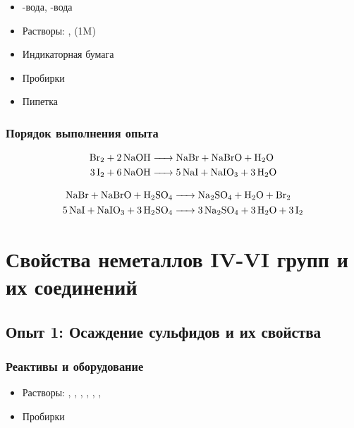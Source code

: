 \documentclass[a4paper, 12pt]{article}
\begin{document}
\begin{itemize}
	\item {}-вода, -вода
	
	\item Растворы: ,  (1M)
	
	\item Индикаторная бумага
	
	\item Пробирки
	
	\item Пипетка
\end{itemize}

\subsubsection{Порядок выполнения опыта}

\begin{align}
	\ce{Br2 + 2NaOH &-> NaBr + NaBrO + H2O}\\
	\ce{3I2 + 6NaOH &-> 5NaI + NaIO3 + 3H2O}
\end{align}

\begin{align}
	\ce{NaBr + NaBrO + H2SO4 &-> Na2SO4 + H2O + Br2}\\
	\ce{5NaI + NaIO3 + 3H2SO4 &-> 3Na2SO4 + 3H2O + 3I2}
\end{align}

\newpage


\section{Свойства неметаллов IV-VI групп и их соединений}

\subsection{Опыт 1: Осаждение сульфидов и их свойства}

\subsubsection{Реактивы и оборудование}

\begin{itemize}
	\item Растворы: , , , , , , 
	
	\item Пробирки
\end{itemize}
\end{document}
